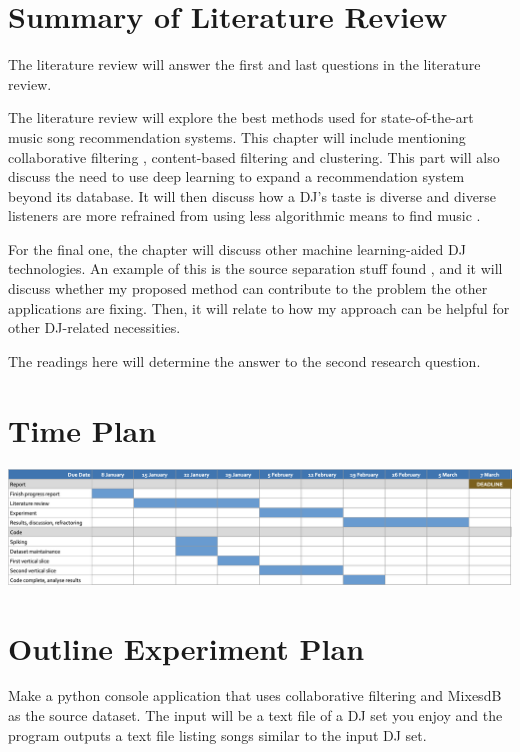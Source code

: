 \documentclass[11pt,titlepage,oneside]{book}
\begin{document}
	
\section{Summary of Literature Review}
\begin{flushleft}
	The literature review will answer the first and last questions in the literature review.
\end{flushleft}
\begin{flushleft}
	The literature review will explore the best methods used for state-of-the-art music song recommendation systems. This chapter will include mentioning collaborative filtering \citep{chow_music_2020}, content-based filtering \citep{chang_building_2021} and clustering\citep{piyush_building_2019}. This part will also discuss the need to use deep learning to expand a recommendation system beyond its database. It will then discuss how a DJ's taste is diverse and diverse listeners are more refrained from using less algorithmic means to find music \citep{anderson_algorithmic_2020}.
\end{flushleft}
\begin{flushleft}
	For the final one, the chapter will discuss other machine learning-aided DJ technologies. An example of this is the source separation stuff found \citep{kirn_review_2023}, and it will discuss whether my proposed method can contribute to the problem the other applications are fixing. Then, it will relate to how my approach can be helpful for other DJ-related necessities. 
\end{flushleft}
\begin{flushleft}
	The readings here will determine the answer to the second research question.
	
\end{flushleft}

\section{Time Plan}

\includegraphics[width=\columnwidth]{timePlan}



\section{Outline Experiment Plan}
Make a python console application that uses collaborative filtering and MixesdB as the source dataset. The input will be a text file of a DJ set you enjoy and the program outputs a text file listing songs similar to the input DJ set.
\end{document}
